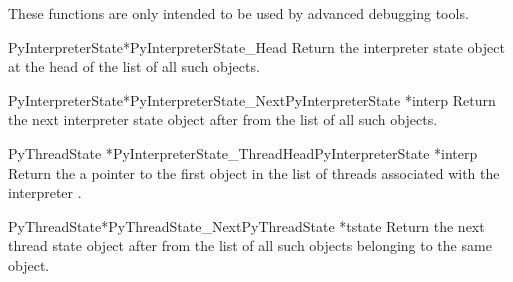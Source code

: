 These functions are only intended to be used by advanced debugging
tools.

\begin{cfuncdesc}{PyInterpreterState*}{PyInterpreterState_Head}{}
  Return the interpreter state object at the head of the list of all
  such objects.
\end{cfuncdesc}

\begin{cfuncdesc}{PyInterpreterState*}{PyInterpreterState_Next}{PyInterpreterState *interp}
  Return the next interpreter state object after  from the
  list of all such objects.
\end{cfuncdesc}

\begin{cfuncdesc}{PyThreadState *}{PyInterpreterState_ThreadHead}{PyInterpreterState *interp}
  Return the a pointer to the first  object in
  the list of threads associated with the interpreter .
\end{cfuncdesc}

\begin{cfuncdesc}{PyThreadState*}{PyThreadState_Next}{PyThreadState *tstate}
  Return the next thread state object after  from the list
  of all such objects belonging to the same 
  object.
\end{cfuncdesc}
